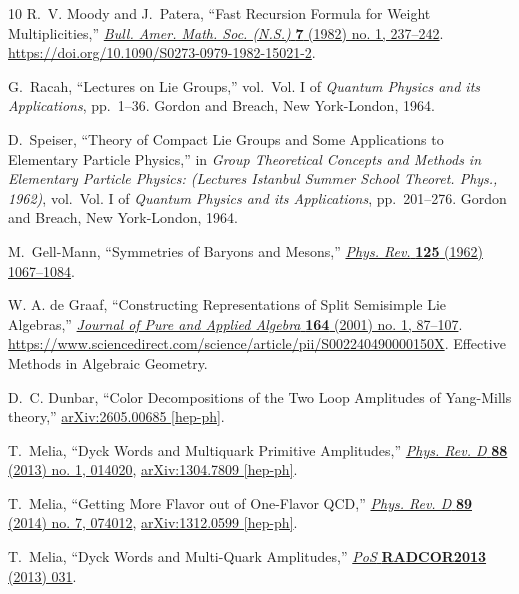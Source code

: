 \documentclass[12pt,a4paper]{article}\let\ifpdf\relax
\begin{document}
\begin{thebibliography}{10}
R.~V. Moody and J.~Patera, ``{Fast Recursion Formula for Weight
  Multiplicities},''
  \href{http://dx.doi.org/10.1090/S0273-0979-1982-15021-2}{{\em Bull. Amer.
  Math. Soc. (N.S.)} {\bf 7} (1982) no. 1, 237--242}.
  \url{https://doi.org/10.1090/S0273-0979-1982-15021-2}.

G.~Racah, ``{Lectures on {L}ie Groups},'' vol.~Vol. I of {\em Quantum Physics
  and its Applications}, pp.~1--36.
\newblock Gordon and Breach, New York-London, 1964.

D.~Speiser, ``{Theory of Compact {L}ie Groups and Some Applications to
  Elementary Particle Physics},'' in {\em {Group Theoretical Concepts and
  Methods in Elementary Particle Physics: ({L}ectures {I}stanbul {S}ummer
  {S}chool {T}heoret. {P}hys., 1962)}}, vol.~Vol. I of {\em Quantum Physics and
  its Applications}, pp.~201--276.
\newblock Gordon and Breach, New York-London, 1964.

M.~Gell-Mann, ``{Symmetries of Baryons and Mesons},''
  \href{http://dx.doi.org/10.1103/PhysRev.125.1067}{{\em Phys. Rev.} {\bf 125}
  (1962)  1067--1084}.

{W. A. {de Graaf}}, ``{Constructing Representations of Split Semisimple Lie
  Algebras},''
  \href{http://dx.doi.org/https://doi.org/10.1016/S0022-4049(00)00150-X}{{\em
  Journal of Pure and Applied Algebra} {\bf 164} (2001) no. 1, 87--107}.
  \url{https://www.sciencedirect.com/science/article/pii/S002240490000150X}.
  Effective Methods in Algebraic Geometry.

D.~C. Dunbar, ``{Color Decompositions of the Two Loop Amplitudes of Yang-Mills
  theory},'' \href{http://arxiv.org/abs/2605.00685}{{ arXiv:2605.00685
  [hep-ph]}}.

T.~Melia, ``{Dyck Words and Multiquark Primitive Amplitudes},''
  \href{http://dx.doi.org/10.1103/PhysRevD.88.014020}{{\em Phys. Rev. D} {\bf
  88} (2013) no. 1, 014020}, \href{http://arxiv.org/abs/1304.7809}{{
  arXiv:1304.7809 [hep-ph]}}.

T.~Melia, ``{Getting More Flavor out of One-Flavor QCD},''
  \href{http://dx.doi.org/10.1103/PhysRevD.89.074012}{{\em Phys. Rev. D} {\bf
  89} (2014) no. 7, 074012}, \href{http://arxiv.org/abs/1312.0599}{{
  arXiv:1312.0599 [hep-ph]}}.

T.~Melia, ``{Dyck Words and Multi-Quark Amplitudes},''
  \href{http://dx.doi.org/10.22323/1.197.0031}{{\em PoS} {\bf RADCOR2013}
  (2013)  031}.


\end{thebibliography}
\end{document}
